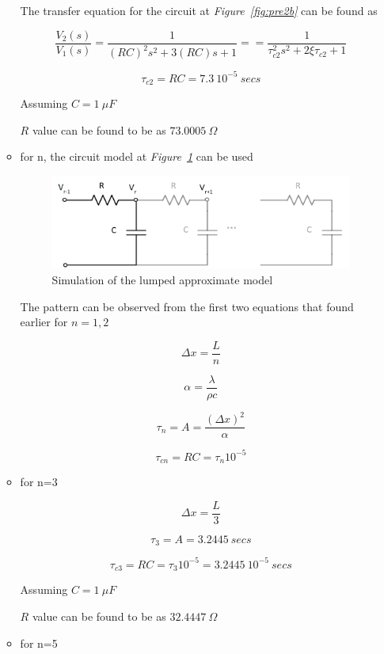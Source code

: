 \documentclass[a4paper,12pt]{article}
\begin{document}
\begin{enumerate}
\begin{itemize}
				The transfer equation for the circuit at \textit{Figure~\ref{fig:pre2b}} can be found as
									
				$$ \frac{V_2(s)}{V_1(s)}=\frac{1}{{(RC)}^2s^2+3(RC)s+1}==\frac{1}{\tau_{c2}^2s^2+ 2 \xi \tau_{c2} +1}				$$
				
				$$ \tau_{c2}=RC=7.3\ 10^{-5}\ secs$$
				
				Assuming $C=1\ \mu F$
				
				$R$ value can be found to be as $73.0005\ \Omega$
				
				\item for n, the circuit model at \textit{Figure~\ref{fig:pre2c}} can be used
				
					\begin{figure}[H]
						\center
						\setlength{\unitlength}{\textwidth} 
						\includegraphics[width=0.9\unitlength]{images/pre2c}
						\caption{\label{fig:pre2c} Simulation of the lumped approximate model}
					\end{figure}
				
					The pattern can be observed from the first two equations that found earlier for $n=1,2$
				
				
					$$ \Delta x = \frac{L}{n} $$
				
					$$ \alpha = \frac{\lambda}{\rho c} $$
				
					$$ \tau_n=A= \frac{{(\Delta x)}^2}{\alpha}  $$
				
				
					$$ \tau_{cn}=RC=\tau_n 10^{-5} $$
				
				\item for n=3
							
					$$ \Delta x = \frac{L}{3} $$
				
					$$ \tau_3=A= 3.2445\ secs $$
				
					$$ \tau_{c3}=RC=\tau_3 10^{-5}=3.2445\ 10^{-5}\ secs  $$
					
					Assuming $C=1\ \mu F$
				
					$R$ value can be found to be as $ 32.4447\ \Omega$
					
				\item for n=5
							

\end{itemize}
\end{enumerate}
\end{document}
